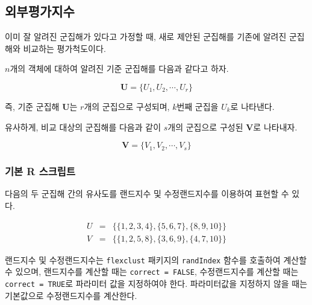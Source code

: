 \documentclass[
]{book}
\begin{document}
\hypertarget{cluster-evaluation-external-index}{%
\subsection{외부평가지수}\label{cluster-evaluation-external-index}}

이미 잘 알려진 군집해가 있다고 가정할 때, 새로 제안된 군집해를 기존에 알려진 군집해와 비교하는 평가척도이다.

\(n\)개의 객체에 대하여 알려진 기준 군집해를 다음과 같다고 하자.

\begin{equation*}
\mathbf{U} = \{ U_1, U_2, \cdots, U_r \}
\end{equation*}

즉, 기준 군집해 \(\mathbf{U}\)는 \(r\)개의 군집으로 구성되며, \(k\)번째 군집을 \(U_k\)로 나타낸다.

유사하게, 비교 대상의 군집해를 다음과 같이 \(s\)개의 군집으로 구성된 \(\mathbf{V}\)로 나타내자.

\begin{equation*}
\mathbf{V} = \{ V_1, V_2, \cdots, V_s \}
\end{equation*}

\hypertarget{cluster-external-index-basic-script}{%
\subsubsection{기본 R 스크립트}\label{cluster-external-index-basic-script}}

다음의 두 군집해 간의 유사도를 랜드지수 및 수정랜드지수를 이용하여 표현할 수 있다.

\begin{eqnarray*}
U &=& \{ \{1, 2, 3, 4\}, \{5, 6, 7\}, \{8, 9, 10\} \}\\
V &=& \{ \{1, 2, 5, 8\}, \{3, 6, 9\}, \{4, 7, 10\} \}
\end{eqnarray*}

랜드지수 및 수정랜드지수는 \texttt{flexclust} 패키지의 \texttt{randIndex} 함수를 호출하여 계산할 수 있으며, 랜드지수를 계산할 때는 \texttt{correct\ =\ FALSE}, 수정랜드지수를 계산할 때는 \texttt{correct\ =\ TRUE}로 파라미터 값을 지정하여야 한다. 파라미터값을 지정하지 않을 때는 기본값으로 수정랜드지수를 계산한다.
\end{document}
